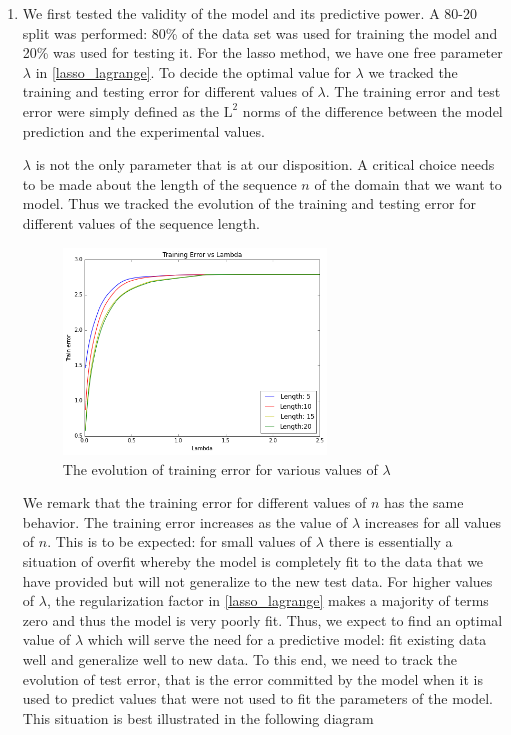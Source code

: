 \documentclass[a4paper, 12pt]{article}
\begin{document}
\begin{enumerate} 
\item 
We first tested the validity of the model and its predictive power. A 80-20 split was performed: 80\% of the data set was used for training the model and 20\% was used for testing it. For the lasso method, we have one free parameter $\lambda$ in \eqref{lasso_lagrange}. To decide the optimal value for $\lambda$ we tracked the training and testing error for different values of $\lambda$. The training error and test error were simply defined as the $\mathrm{L}^2$ norms of the difference between the model prediction and the experimental values. 

$\lambda$ is not the only parameter that is at our disposition. A critical choice needs to be made about the length of the sequence $n$ of the domain that we want to model. Thus we tracked the evolution of the training and testing error for different values of the sequence length.

\begin{figure}[!h]
\centering 
\label{train_error_lambda_1}
\includegraphics[width=7cm]{Images/train_error_lambda.png}
\caption{The evolution of training error for various values of $\lambda$}
\end{figure} 

We remark that the training error for different values of $n$ has the same behavior. The training error increases as the value of $\lambda$ increases for all values of $n$. This is to be expected: for small values of $\lambda$ there is essentially a situation of overfit whereby the model is completely fit to the data that we have provided but will not generalize to the new test data. For higher values of $\lambda$, the regularization factor in \eqref{lasso_lagrange} makes a majority of terms zero and thus the model is very poorly fit. Thus, we expect to find an optimal value of $\lambda$ which will serve the need for a predictive model: fit existing data well and generalize well to new data. To this end, we need to track the evolution of test error, that is the error committed by the model when it is used to predict values that were not used to fit the parameters of the model. This situation is best illustrated in the following diagram 


\end{enumerate}
\end{document}

